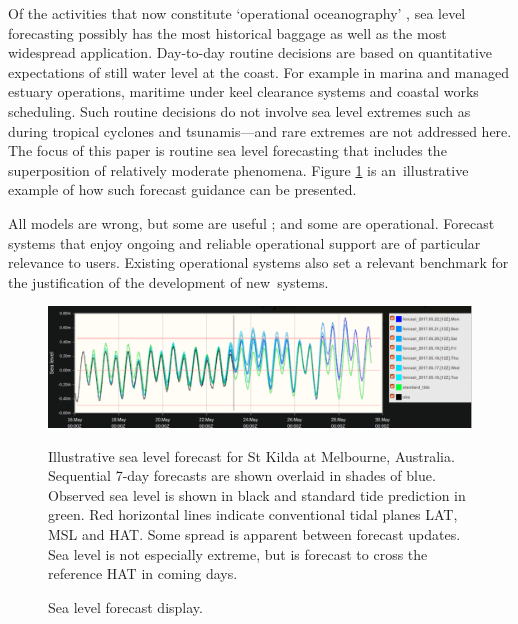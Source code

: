 Of the activities that now constitute `operational oceanography' \citep{Bell:2009uv}, sea level forecasting possibly has the most historical baggage as well as the most widespread application.
Day-to-day routine decisions are based on quantitative expectations of still water level \citep{Pugh:2014di} at the coast.  
For example in marina and managed estuary operations, maritime under keel clearance systems and coastal works scheduling. 
Such routine decisions do not involve sea level extremes such as during tropical cyclones and tsunamis---and rare extremes are not addressed here. 
The focus of this paper is routine sea level forecasting that includes the superposition of relatively moderate phenomena.
Figure \ref{fig:fc_eg} is an~illustrative example of how such forecast guidance can be presented. 


All models are wrong, but some are useful \citep{Box:1979wz}; and some are operational.        %
Forecast systems that enjoy ongoing and reliable operational support are of particular relevance to users.
Existing operational systems also set a relevant benchmark for the justification of the development of new~systems.  

\begin{figure}[!hbt] \centering
\includegraphics[width=1\textwidth]{figures/plots/forecast_eg.png}
\caption{Sea level forecast display.}{Illustrative sea level forecast for St Kilda at Melbourne, Australia.  Sequential 7-day forecasts are shown overlaid in shades of blue.  Observed sea level is shown in black and standard tide prediction in green.  Red horizontal lines indicate conventional tidal planes LAT, MSL and HAT.  Some spread is apparent between forecast updates.  Sea level is not especially extreme, but is forecast to cross the reference HAT in coming days.}
\label{fig:fc_eg}
\end{figure}   


